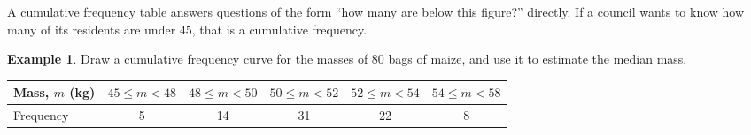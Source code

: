 \documentclass[11pt,a4paper]{article}
\theoremstyle{definition}
\newtheorem{example}[thm]{Example}
\begin{document}
A cumulative frequency table answers questions of the form ``how many are below this
figure?'' directly. If a council wants to know how many of its residents are under $45$,
that is a cumulative frequency.

\begin{example}
Draw a cumulative frequency curve for the masses of $80$ bags of maize, and use it to
estimate the median mass.

\begin{table}[H]
\centering
\begin{tabular}{|l|c|c|c|c|c|}
\hline
Mass, $m$ (kg) & $45\leq m<48$ & $48\leq m<50$ & $50\leq m<52$ & $52\leq m<54$ &
$54\leq m<58$\\
\hline
Frequency & 5 & 14 & 31 & 22 & 8\\
\hline
\end{tabular}
\end{table}
\end{example}
\end{document}
